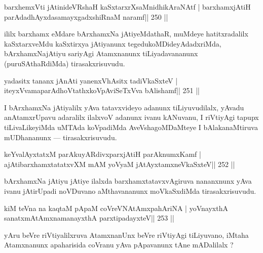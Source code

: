 
\begin{shl}
barxhemxVti jAtinideVRshaH kaSxtarxrXsaMnidhikAraNAtf |
barxhamxjAtiH parAdadhAyxdasamayxgadxshiRnaM naramf\hfill || 250 ||
\end{shl}

\begin{artha}
ililx barxhamx eMdare bArxhamxNa jAtiyeMdathaR, muMdeye hatitxradalilx kaSxtarxveMdu kaSxtirxya jAtiyanunx tegedukoMDideyAdadxriMda, bArxhamxNajAtiyu sariyAgi Atamxnanunx tiLiyadavananunx (puruSAthaRdiMda) tirasakxrisuvudu.
\end{artha}


\begin{shl}
yadasitx tananx jAnAti yanenxVhAsitx tadiVkaSxteV |
iteyxVvamaparAdhoVtathxkoVpAviSeTxVva bAlishamf\hfill || 251 ||
\end{shl}

\begin{artha}
I bArxhamxNa jAtiyalilx yAva tatavxvideyo adanunx tiLiyuvudilalx, yAvadu anAtamxrUpavu adaralilx ilalxvoV adanunx ivanu kANuvanu, I riVtiyAgi tapupx tiLivaLikeyiMda uMTAda koVpadiMda AveVshagoMDaMteye I bAlakanaMtiruva mUDhananunx  {\rm ---}  tirasakxrisuvudu.
\end{artha}

\begin{shl}
keYvalAyxtatxM parAkuyARdivxparxjAtiH parAknumxKamf |
ajAtibarxhamxtatatxvXM mAM yoV\s yaM jAtAyxtamxneVkaSxteV\hfill || 252 ||
\end{shl}

\begin{artha}
bArxhamxNa jAtiyu jAtiye ilalxda barxhamxtatavxvAgiruva nananxnunx yAva ivanu jAtirUpadi noVDuvano aMthavananunx moVkaSxdiMda tirasakxrisuvudu.
\end{artha}


\begin{shl}
kiM teVna na kaqtaM pApaM coVreVNA\s\s tAmxpahAriNA |
yoV\s nayxthA sanatxmAtAmxnamanayxthA parxtipadayxteV\hfill || 253 ||
\end{shl}

\begin{artha}
yAru beVre riVtiyalilxruva AtamxnanUnx beVre riVtiyAgi tiLiyuvano, iMtaha Atamxnanunx apaharisida coVranu yAva pApavanunx tAne mADalilalx ?
\end{artha}

